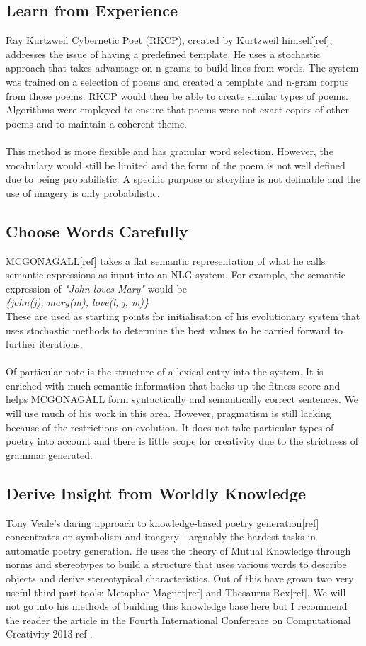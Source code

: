 \subsection{Learn from Experience}

Ray Kurtzweil Cybernetic Poet (RKCP), created by Kurtzweil himself[ref], addresses the issue of having a predefined template. He uses a stochastic approach that takes advantage on n-grams to build lines from words. The system was trained on a selection of poems and created a template and n-gram corpus from those poems. RKCP would then be able to create similar types of poems. Algorithms were employed to ensure that poems were not exact copies of other poems and to maintain a coherent theme.
\\\\
This method is more flexible and has granular word selection. However, the vocabulary would still be limited and the form of the poem is not well defined due to being probabilistic. A specific purpose or storyline is not definable and the use of imagery is only probabilistic.


\subsection{Choose Words Carefully}
MCGONAGALL[ref] takes a flat semantic representation of what he calls semantic expressions as input into an NLG system. For example, the semantic expression of \textit{"John loves Mary"} would be\\ \textit{\{john(j), mary(m), love(l, j, m)\}}
\\
These are used as starting points for initialisation of his evolutionary system that uses stochastic methods to determine the best values to be carried forward to further iterations.
\\\\
Of particular note is the structure of a lexical entry into the system. It is enriched with much semantic information that backs up the fitness score and helps MCGONAGALL form syntactically and semantically correct sentences. We will use much of his work in this area. However, pragmatism is still lacking because of the restrictions on evolution. It does not take particular types of poetry into account and there is little scope for creativity due to the strictness of grammar generated. 


\subsection{Derive Insight from Worldly Knowledge}
Tony Veale's daring approach to knowledge-based poetry generation[ref] concentrates on symbolism and imagery - arguably the hardest tasks in automatic poetry generation. He uses the theory of Mutual Knowledge through norms and stereotypes to build a structure that uses various words to describe objects and derive stereotypical characteristics. Out of this have grown two very useful third-part tools: Metaphor Magnet[ref] and Thesaurus Rex[ref]. We will not go into his methods of building this knowledge base here but I recommend the reader the article in the Fourth International Conference on Computational Creativity 2013[ref].


